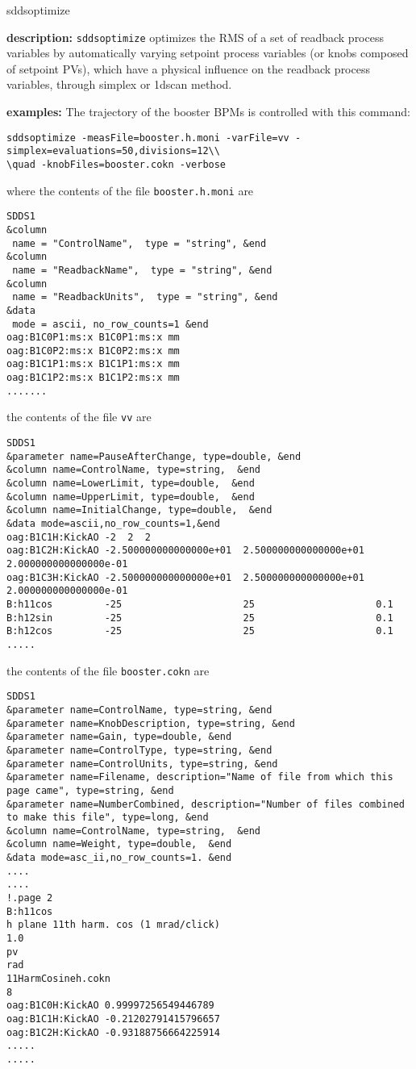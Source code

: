\begin{sddsprog}{sddsoptimize}
\item \textbf{description:}
\verb+sddsoptimize+ optimizes the RMS of a set of readback process variables by automatically varying setpoint process variables (or knobs composed of setpoint PVs), which have a physical influence on the readback process variables, through simplex or 1dscan method.

\item \textbf{examples:}
The trajectory of the booster BPMs is controlled with this command:
\begin{verbatim}
sddsoptimize -measFile=booster.h.moni -varFile=vv -simplex=evaluations=50,divisions=12\\
\quad -knobFiles=booster.cokn -verbose
\end{verbatim}
where the contents of the file \verb+booster.h.moni+ are
\begin{verbatim}
SDDS1
&column
 name = "ControlName",  type = "string", &end
&column
 name = "ReadbackName",  type = "string", &end
&column
 name = "ReadbackUnits",  type = "string", &end
&data
 mode = ascii, no_row_counts=1 &end
oag:B1C0P1:ms:x B1C0P1:ms:x mm
oag:B1C0P2:ms:x B1C0P2:ms:x mm
oag:B1C1P1:ms:x B1C1P1:ms:x mm
oag:B1C1P2:ms:x B1C1P2:ms:x mm
.......

\end{verbatim}
the contents of the file \verb+vv+ are
\begin{verbatim}
SDDS1
&parameter name=PauseAfterChange, type=double, &end
&column name=ControlName, type=string,  &end
&column name=LowerLimit, type=double,  &end
&column name=UpperLimit, type=double,  &end
&column name=InitialChange, type=double,  &end
&data mode=ascii,no_row_counts=1,&end
oag:B1C1H:KickAO -2  2  2
oag:B1C2H:KickAO -2.500000000000000e+01  2.500000000000000e+01  2.000000000000000e-01
oag:B1C3H:KickAO -2.500000000000000e+01  2.500000000000000e+01  2.000000000000000e-01
B:h11cos         -25                     25                     0.1
B:h12sin         -25                     25                     0.1
B:h12cos         -25                     25                     0.1
.....

\end{verbatim}
the contents of the file \verb+booster.cokn+ are
\begin{verbatim}
SDDS1
&parameter name=ControlName, type=string, &end
&parameter name=KnobDescription, type=string, &end
&parameter name=Gain, type=double, &end
&parameter name=ControlType, type=string, &end
&parameter name=ControlUnits, type=string, &end
&parameter name=Filename, description="Name of file from which this page came", type=string, &end
&parameter name=NumberCombined, description="Number of files combined to make this file", type=long, &end
&column name=ControlName, type=string,  &end
&column name=Weight, type=double,  &end
&data mode=asc_ii,no_row_counts=1. &end
....
....
!.page 2
B:h11cos
h plane 11th harm. cos (1 mrad/click)
1.0
pv
rad
11HarmCosineh.cokn
8
oag:B1C0H:KickAO 0.99997256549446789
oag:B1C1H:KickAO -0.21202791415796657
oag:B1C2H:KickAO -0.93188756664225914
.....
.....


\end{verbatim}
\end{sddsprog}
